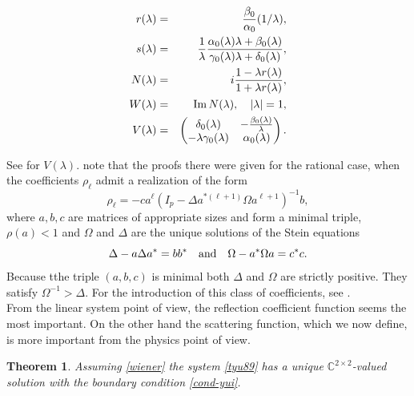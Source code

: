 \documentclass[12pt]{amsart}
\newtheorem{thm}{Theorem}[section]
\theoremstyle{definition}
\theoremstyle{remark}
\numberwithin{equation}{section}
\begin{document}
    \begin{eqnarray}
      r({\lambda})&=&\frac{\beta_0}{\alpha_0}(1/{\lambda}),\\
      \label{szscattering}
      s({\lambda})&=&\frac{1}{{\lambda}}\frac{\alpha_0({\lambda}){\lambda}+\beta_0({\lambda})}{\gamma_0({\lambda}){\lambda}+\delta_0({\lambda})},\\
      N({\lambda})&=&i\frac{1-{\lambda}r({\lambda})}{1+{\lambda}r({\lambda})},\\
      \label{vvv}
      W({\lambda})&=&{\rm Im}\, N({\lambda}),\quad |{\lambda}|=1,\\
      V({\lambda})&=&\begin{pmatrix}\delta_0({\lambda})&-\frac{\beta_0({\lambda})}{{\lambda}}\\
        -{\lambda}\gamma_0({\lambda})&\alpha_0({\lambda})\end{pmatrix}.
      \end{eqnarray}

      See \cite[(2.22) p. 40]{MR2216236} for $V({\lambda})$. note that the proofs there were given for the rational case, when the coefficients $\rho_\ell$ admit a realization
      of the form
      \begin{equation}
        \rho_\ell=-ca^\ell(I_p-\Delta a^{*(\ell+1)}\Omega a^{\ell+1})^{-1}b,
      \end{equation}
      where $a,b,c$ are matrices of appropriate sizes and form a minimal triple, $\rho(a)<1$ and $\Omega$ and $\Delta$ are the unique solutions of the Stein equations
      \[
\Delta-a\Delta a^*=bb^*\quad{\rm and}\quad \Omega-a^*\Omega a=c^*c.
\]
Because tthe triple $(a,b,c)$ is minimal both $\Delta$ and $\Omega$ are strictly positive. They
satisfy $\Omega^{-1}>\Delta$. For the introduction of this class of coefficients, see \cite{MR2002d:47021}.\\


  From the linear system point of view, the reflection coefficient function seems the most important. On the other hand the scattering function, which we now define, is
  more important from the physics point of view.

  \begin{thm}
    Assuming \eqref{wiener} the system \eqref{tyu89} has a unique $\mathbb C^{2\times 2}$-valued solution with the boundary condition \eqref{cond-yui}.
    \end{thm}
\end{document}

